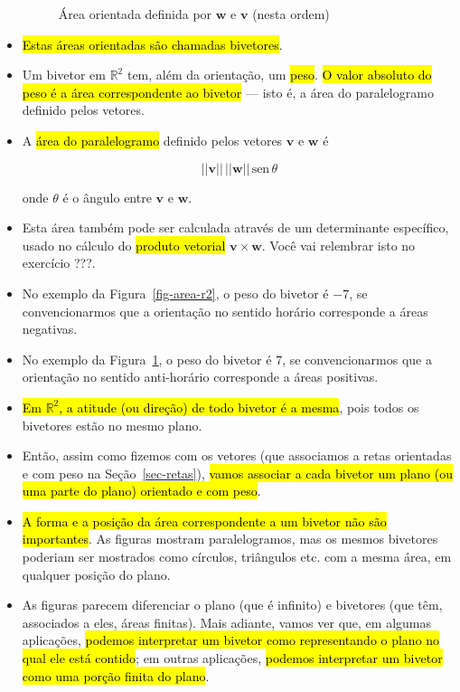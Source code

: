 \documentclass[
  letterpaper,
  DIV=11,
  numbers=noendperiod]{scrreprt}
\begin{document}
\begin{itemize}
\begin{figure}[htb]
{  }

  \caption{\label{fig-area-r2-2}Área orientada definida por $\mathbf{w}$
  e $\mathbf{v}$ (nesta ordem)}

  \end{figure}
\item
  {\hl{Estas áreas orientadas são chamadas bivetores}}.
\item
  Um bivetor em $\mathbb{R}^2$ tem, além da orientação, um {\hl{peso}}.
  {\hl{O valor absoluto do peso é a área correspondente ao bivetor}} ---
  isto é, a área do paralelogramo definido pelos vetores.
\item
  A {\hl{área do paralelogramo}} definido pelos vetores $\mathbf{v}$ e
  $\mathbf{w}$ é

  \[
  ||\mathbf{v}||\, ||\mathbf{w}|| \,\text{sen}\,\theta
  \]

  onde $\theta$ é o ângulo entre $\mathbf{v}$ e $\mathbf{w}$.
\item
  Esta área também pode ser calculada através de um determinante
  específico, usado no cálculo do {\hl{produto vetorial}}
  $\mathbf{v} \times \mathbf{w}$. Você vai relembrar isto no exercício
  ???.
\item
  No exemplo da Figura~\ref{fig-area-r2}, o peso do bivetor é $-7$, se
  convencionarmos que a orientação no sentido horário corresponde a
  áreas negativas.
\item
  No exemplo da Figura~\ref{fig-area-r2-2}, o peso do bivetor é $7$, se
  convencionarmos que a orientação no sentido anti-horário corresponde a
  áreas positivas.
\item
  {\hl{Em $\mathbb{R}^2$, a atitude (ou direção) de todo bivetor é a
  mesma}}, pois todos os bivetores estão no mesmo plano.
\item
  Então, assim como fizemos com os vetores (que associamos a retas
  orientadas e com peso na Seção~\ref{sec-retas}), {\hl{vamos associar a
  cada bivetor um plano (ou uma parte do plano) orientado e com peso}}.
\item
  {\hl{A forma e a posição da área correspondente a um bivetor não são
  importantes}}. As figuras mostram paralelogramos, mas os mesmos
  bivetores poderiam ser mostrados como círculos, triângulos etc. com a
  mesma área, em qualquer posição do plano.
\item
  As figuras parecem diferenciar o plano (que é infinito) e bivetores
  (que têm, associados a eles, áreas finitas). Mais adiante, vamos ver
  que, em algumas aplicações, {\hl{podemos interpretar um bivetor como
  representando o plano no qual ele está contido}}; em outras
  aplicações, {\hl{podemos interpretar um bivetor como uma porção finita
  do plano}}.


\end{itemize}
\end{document}
